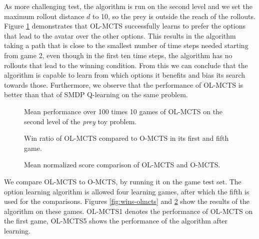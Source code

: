 As more challenging test, the algorithm is run on the second level and we set
the maximum rollout distance $d$ to 10, so the prey is outside the reach of the
rollouts. Figure \ref{fig:olmctsPrey3} demonstrates that OL-MCTS successfully
learns to prefer the options that lead to the avatar over the other options.
This results in the algorithm taking a path that is close to the smallest number
of time steps needed starting from game 2, even though in the first ten time
steps, the algorithm has no rollouts that lead to the winning condition. From
this we can conclude that the algorithm is capable to learn from which options
it benefits and bias its search towards those. Furthermore, we observe that the
performance of OL-MCTS is better than that of SMDP Q-learning on the same
problem.

\begin{figure}
	\centering
	\caption{Mean performance over 100 times 10 games of OL-MCTS on the second
		level of the \textit{prey} toy problem.}
	\label{fig:olmctsPrey3}
\end{figure}


\begin{figure}
	\centering
	\vspace{-.8cm}
	\caption{Win ratio of OL-MCTS compared to O-MCTS in its first and fifth game.}
	\label{fig:wins-olmcts}
	\centering
	\vspace{-.8cm}
	\caption{Mean normalized score comparison of OL-MCTS and O-MCTS.}
	\label{fig:scores-olmcts}
\end{figure}

We compare OL-MCTS to O-MCTS, by running it on the game test set.  The option
learning algorithm is allowed four learning games, after which the fifth is used
for the comparisons. Figures \ref{fig:wins-olmcts} and \ref{fig:scores-olmcts}
show the results of the algorithm on these games.  OL-MCTS1 denotes the
performance of OL-MCTS on the first game, OL-MCTS5 shows the performance of the
algorithm after learning. 

